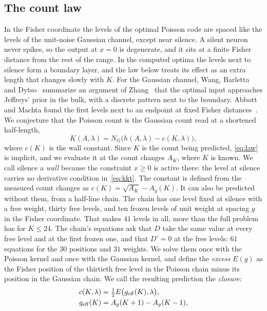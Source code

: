 \documentclass[journal]{IEEEtran}
\begin{document}
\subsection{The count law}
In the Fisher coordinate the levels of the optimal Poisson code are spaced like the levels of the unit-noise Gaussian channel, except
near silence. A silent neuron never spikes, so the output at $x = 0$ is degenerate, and it sits at a finite Fisher distance from the
rest of the range. In the computed optima the levels next to silence form a boundary layer, and the law below treats its effect as an
extra length that changes slowly with $K$. For the Gaussian channel, Wang, Barletta and Dytso~\cite{WBD2025} summarize an argument of
Zhang~\cite{Zhang1994} that the optimal input approaches Jeffreys' prior in the bulk, with a discrete pattern next to the boundary.
Abbott and Machta found
the first levels next to an endpoint at fixed Fisher distances~\cite{AbbottMachta2019}. We conjecture that the Poisson count is the Gaussian count read at a shortened
half-length,
\begin{equation}
K(A, \lambda) = N_G\big(h(A, \lambda) - c(K, \lambda)\big),\label{eq:law}
\end{equation}
where $c(K)$ is the wall constant. Since $K$ is the count being predicted, \eqref{eq:law} is implicit, and we evaluate it at the count
changes $A_K$, where $K$ is known. We call silence a \emph{wall} because the constraint $x \ge 0$ is active there: the level at
silence carries no derivative condition in~\eqref{eq:kkt}. The constant is defined from the measured count changes as $c(K) =
\sqrt{A_K} - A_g(K)$. It can also be predicted without them, from a half-line chain. The chain has one level fixed at silence with a free
weight, thirty free levels, and ten frozen levels of unit weight at spacing $g$ in the Fisher coordinate. That makes $41$ levels in
all, more than the full problem has for $K \le 24$. The chain's equations ask that $D$
take the same value at every free level and at the first frozen one, and that $D' = 0$ at the free levels: $61$ equations for the
$30$ positions and $31$ weights. We solve them once with the Poisson kernel and once with the Gaussian kernel, and define the
\emph{excess} $E(g)$ as the Fisher position of the thirtieth free level in the Poisson chain minus its position in the Gaussian chain.
We call the resulting prediction the \emph{closure}:
\begin{align}
c(K, \lambda) &= \tfrac12 E\big(g_{\rm eff}(K), \lambda\big),\label{eq:closure}\\
g_{\rm eff}(K) &= A_g(K + 1) - A_g(K - 1),\nonumber
\end{align}
\end{document}

